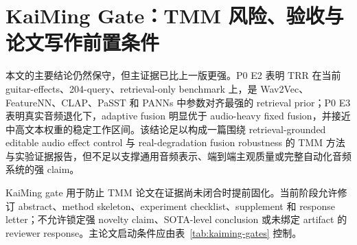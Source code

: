\chapter{KaiMing Gate：TMM 风险、验收与论文写作前置条件}
\label{chap:risks}

本文的主要结论仍然保守，但主证据已比上一版更强。P0 E2 表明 TRR 在当前 guitar-effects、204-query、retrieval-only benchmark 上，是 Wav2Vec、FeatureNN、CLAP、PaSST 和 PANNs 中参数对齐最强的 retrieval prior；P0 E3 表明真实音频退化下，adaptive fusion 明显优于 audio-heavy fixed fusion，并接近中高文本权重的稳定工作区间。该结论足以构成一篇围绕 retrieval-grounded editable audio effect control 与 real-degradation fusion robustness 的 TMM 方法与实验证据报告，但不足以支撑通用音频表示、端到端主观质量或完整自动化音频系统的强 claim。



KaiMing gate 用于防止 TMM 论文在证据尚未闭合时提前固化。当前阶段允许修订 abstract、method skeleton、experiment checklist、supplement 和 response letter；不允许锁定强 novelty claim、SOTA-level conclusion 或未绑定 artifact 的 reviewer response。主论文启动条件应由表~\ref{tab:kaiming-gates} 控制。

\begin{table}[H]
	\centering
	\caption{KaiMing gate 与 TMM 论文写作前置条件。}
	\label{tab:kaiming-gates}
	\scriptsize
\end{table}

